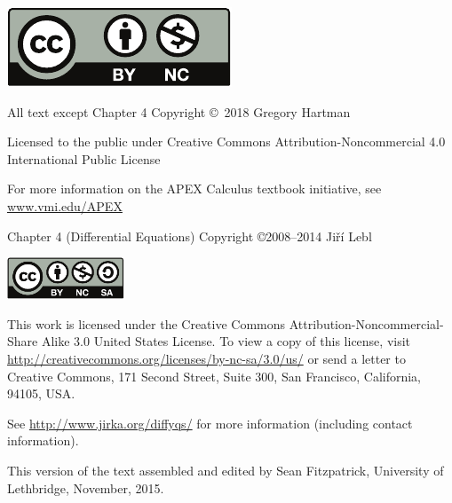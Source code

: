 \noindent\hskip -1in\begin{minipage}{2in}
\includegraphics{text/by-nc} 
\end{minipage}
\begin{minipage}{3in}
\noindent All text except Chapter 4 Copyright \copyright\ 2018 Gregory Hartman

Licensed to the public under Creative Commons Attribution-Noncommercial 4.0 International Public License

\bigskip

For more information on the APEX Calculus textbook initiative, see \href{http://www.vmi.edu/APEX}{www.vmi.edu/APEX}
\end{minipage}

Chapter 4 (Differential Equations) Copyright \copyright 2008--2014 Ji{\v r}\'i Lebl

\bigskip

\noindent
\includegraphics[width=1.38in]{figures/license}

\bigskip

\noindent
This work is licensed under the Creative Commons
Attribution-Non\-commercial-Share Alike 3.0 United States License. To view a
copy of this license, visit
\url{http://creativecommons.org/licenses/by-nc-sa/3.0/us/} or send a letter to
Creative Commons, 171 Second Street, Suite 300, San Francisco, California,
94105, USA.

\bigskip


\noindent
See \href{http://www.jirka.org/diffyqs/}{http://www.jirka.org/diffyqs/} for more information
(including contact information).

\bigskip

\bigskip

This version of the text assembled and edited by Sean Fitzpatrick, University of Lethbridge, November, 2015. 

